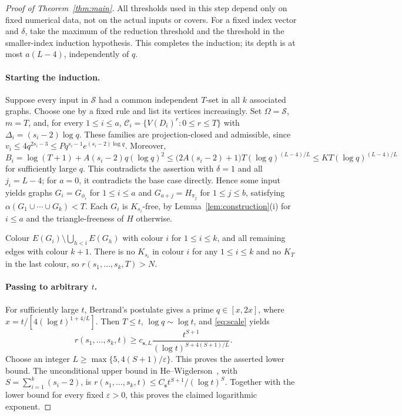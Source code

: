 \documentclass[11pt,a4paper]{article}
\numberwithin{equation}{section}
\newcommand{\cC}{\mathcal C}
\newcommand{\cS}{\mathcal S}
\newcommand{\eps}{\varepsilon}
\begin{document}
\begin{proof}[Proof of Theorem~\ref{thm:main}]
All thresholds used in this step depend only on fixed numerical
data, not on the actual inputs or covers.
For a fixed index vector and $\delta$, take the maximum of the
reduction threshold and the threshold in the smaller-index
induction hypothesis.
This completes the induction; its depth is at most $a(L-4)$,
independently of $q$.

\paragraph{Starting the induction.}
Suppose every input in $\cS$ had a common independent
$T$-set in all $k$ associated graphs. Choose one by a fixed rule
and list its vertices increasingly. Set $\Omega=\cS$, $m=T$,
and, for every $1\le i\le a$,
$\cC_i=\{V(D_i)^r:0\le r\le T\}$ with
$\Delta_i=(s_i-2)\log q$.
These families are projection-closed and admissible, since
$v_i\le4q^{2s_i-3}\le Pq^{s_i-1}e^{(s_i-2)\log q}$.
Moreover,
\[
 B_i=\log(T+1)+A(s_i-2)q(\log q)^2
 \le\bigl(2A(s_i-2)+1\bigr)T(\log q)^{(L-4)/L}
 \le KT(\log q)^{(L-4)/L}
\]
for sufficiently large $q$.
This contradicts the assertion with $\delta=1$ and
all $j_i=L-4$; for $a=0$, it contradicts the base case directly.
Hence some input yields graphs
$G_i=G_{\phi_i}$ for $1\le i\le a$ and
$G_{a+j}=H_{\pi_j}$ for $1\le j\le b$, satisfying
$\alpha(G_1\cup\cdots\cup G_k)<T$.
Each $G_i$ is $K_{s_i}$-free, by Lemma~\ref{lem:construction}(i)
for $i\le a$ and the triangle-freeness of $H$ otherwise.

Colour $E(G_i)\setminus\bigcup_{h<i}E(G_h)$ with colour $i$
for $1\le i\le k$, and all remaining edges with colour $k+1$.
There is no $K_{s_i}$ in colour $i$ for any $1\le i\le k$ and
no $K_T$ in the last colour, so $r(s_1,\ldots,s_k,T)>N$.

\paragraph{Passing to arbitrary $t$.}
For sufficiently large $t$, Bertrand's postulate gives a prime
$q\in[x,2x]$, where $x=t/[4(\log t)^{1+4/L}]$.
Then $T\le t$, $\log q\sim\log t$, and \eqref{eq:scale} yields
\[
 r(s_1,\ldots,s_k,t)
 \ge c_{\boldsymbol{s},L}\frac{t^{S+1}}
 {(\log t)^{S+4(S+1)/L}}.
\]
Choose an integer $L\ge\max\{5,4(S+1)/\eps\}$.
This proves the asserted lower bound.
The unconditional upper bound in
He--Wigderson~\cite[Appendix~B]{HW}, with
$S=\sum_{i=1}^k(s_i-2)$, is
$r(s_1,\ldots,s_k,t)\le C_{\boldsymbol{s}}t^{S+1}/(\log t)^S$.
Together with the lower bound for every fixed $\eps>0$, this
proves the claimed logarithmic exponent.
\end{proof}
\end{document}
